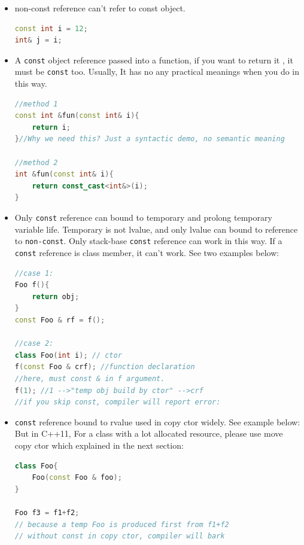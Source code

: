 \documentclass[a4paper,12pt,twoside]{book}
\begin{document}
\begin{itemize}
\item non-const reference can't refer to const object.
\begin{lstlisting}[frame=single, language=c++]
const int i = 12;
int& j = i;
\end{lstlisting}

\item A \texttt{const} object reference passed into a function, if you want to return it , it must be \texttt{const} too. Usually, It has no any practical meanings when you do in this way. 
\begin{lstlisting}[frame=single, language=c++]
//method 1
const int &fun(const int& i){
	return i;
}//Why we need this? Just a syntactic demo, no semantic meaning

//method 2
int &fun(const int& i){
	return const_cast<int&>(i);
}
\end{lstlisting}

\item Only \texttt{const} reference can bound to temporary and prolong temporary variable life. Temporary is not lvalue, and only lvalue can bound to reference to \texttt{non-const}. Only stack-base \texttt{const} reference can work in this way. If a \texttt{const} reference is class member, it can't work.  See two examples below:
\begin{lstlisting}[frame=single, language=c++]
//case 1:
Foo f(){
	return obj;
}
const Foo & rf = f();

//case 2:
class Foo(int i); // ctor
f(const Foo & crf); //function declaration
//here, must const & in f argument.
f(1); //1 -->"temp obj build by ctor" -->crf
//if you skip const, compiler will report error:
\end{lstlisting}

\item \texttt{const} reference bound to rvalue used in copy ctor widely. See example below: But in C++11, For a class with a lot allocated resource, please use move copy ctor which explained in the next section:

\begin{lstlisting}[frame=single, language=c++]
class Foo{
	Foo(const Foo & foo);
}

Foo f3 = f1+f2;
// because a temp Foo is produced first from f1+f2
// without const in copy ctor, compiler will bark
\end{lstlisting}
\end{itemize}
\end{document}

